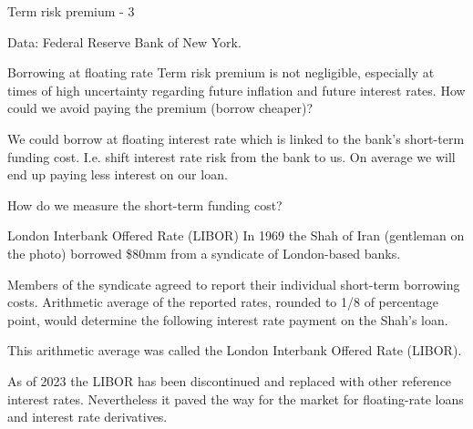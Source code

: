 \documentclass{beamer}
\begin{document}
\begin{frame}{Term risk premium - 3}
\center
{}

\scriptsize Data: Federal Reserve Bank of New York.
\end{frame}



\begin{frame}{Borrowing at floating rate}
\justify
Term risk premium is not negligible, especially at times of high uncertainty regarding future inflation and future interest rates. How could we avoid paying the premium (borrow cheaper)?

\justify
We could borrow at floating interest rate which is linked to the bank's short-term funding cost. I.e. shift interest rate risk from the bank to us. On average we will end up paying less interest on our loan.

\justify
How do we measure the short-term funding cost?
\end{frame}



\begin{frame}{London Interbank Offered Rate (LIBOR)}
\justify
In 1969 the Shah of Iran (gentleman on the photo) borrowed \$80mm from a syndicate of London-based banks.

\justify
Members of the syndicate agreed to report their individual short-term borrowing costs. Arithmetic average of the reported rates, rounded to 1/8 of percentage point, would determine the following interest rate payment on the Shah's loan.

\justify
This arithmetic average was called the \alert{London Interbank Offered Rate (LIBOR)}. 
 
\justify
As of 2023 the LIBOR has been discontinued and replaced with other reference interest rates. Nevertheless it paved the way for the market for floating-rate loans and interest rate derivatives.
\end{frame}
\end{document}
